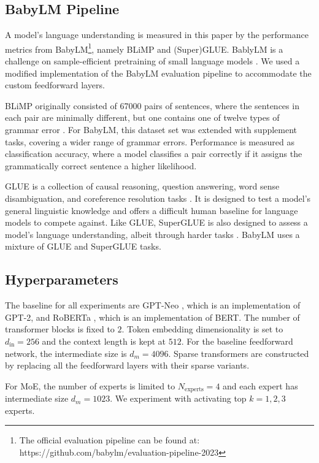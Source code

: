 \subsection{BabyLM Pipeline}
A model's language understanding is measured in this paper by the performance metrics from BabyLM\footnote{The official evaluation pipeline can be found at: https://github.com/babylm/evaluation-pipeline-2023}, namely BLiMP and (Super)GLUE. BablyLM is a challenge on sample-efficient pretraining of small language models \cite{warstadt_call_2023}. We used a modified implementation of the BabyLM evaluation pipeline to accommodate the custom feedforward layers.

BLiMP originally consisted of 67000 pairs of sentences, where the sentences in each pair are minimally different, but one contains one of twelve types of grammar error \cite{warstadt_blimp_2023}. For BabyLM, this dataset set was extended with supplement tasks, covering a wider range of grammar errors. Performance is measured as classification accuracy, where a model classifies a pair correctly if it assigns the grammatically correct sentence a higher likelihood.

GLUE is a collection of causal reasoning, question answering, word sense disambiguation, and coreference resolution tasks \cite{wang_glue_2019}. It is designed to test a model's general linguistic knowledge and offers a difficult human baseline for language models to compete against. Like GLUE, SuperGLUE is also designed to assess a model's language understanding, albeit through harder tasks \cite{wang_superglue_2020}. BabyLM uses a mixture of GLUE and SuperGLUE tasks.


\subsection{Hyperparameters}
The baseline for all experiments are GPT-Neo \cite{black_gpt-neo_2021}, which is an implementation of GPT-2, and RoBERTa \cite{liu_roberta_2019}, which is an implementation of BERT. The number of transformer blocks is fixed to $2$. Token embedding dimensionality is set to $d_\text{in}=256$ and the context length is kept at $512$. For the baseline feedforward network, the intermediate size is $d_m = 4096$. Sparse transformers are constructed by replacing all the feedforward layers with their sparse variants.

For MoE, the number of experts is limited to $N_\text{experts}=4$ and each expert has intermediate size $d_m = 1023$. We experiment with activating top $k=1,2,3$ experts.

